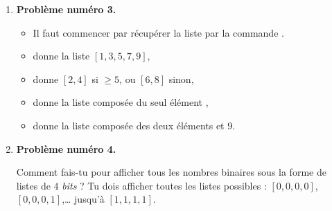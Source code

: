 \documentclass[11pt,class=report,crop=false]{standalone}
\begin{document}
\begin{activite}
\begin{enumerate}
\begin{enumerate}
    \item \textbf{Problème numéro 3.} 
     \begin{itemize}
      \item Il faut commencer par récupérer la liste  par la commande .
       \item {} donne la liste $[1,3,5,7,9]$,
       \item {} donne $[2,4]$ si  $\ge 5$, ou $[6,8]$ sinon,
       \item {} donne la liste composée du seul élément ,
       \item {} donne la liste composée des deux éléments  et $9$.
      \end{itemize}   
    
    
    \item \textbf{Problème numéro 4.} 
    
    Comment fais-tu pour afficher tous les nombres binaires sous la forme de listes de $4$ \emph{bits} ? Tu dois afficher toutes les listes possibles : $[0,0,0,0]$, $[0,0,0,1]$,\ldots{} jusqu'à $[1,1,1,1]$.
  \end{enumerate}    
  
  
\end{enumerate} 

\end{activite}




\end{document}
